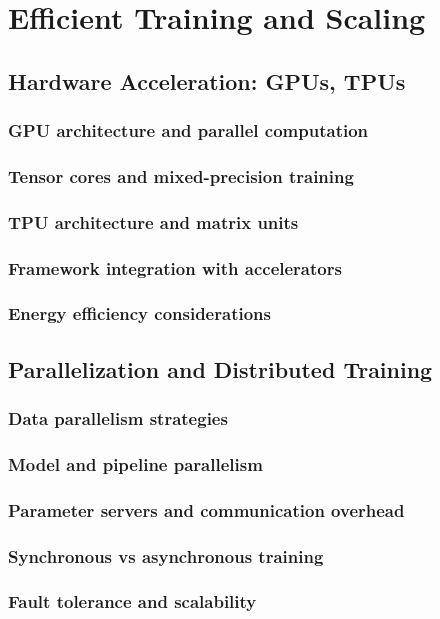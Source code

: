 ﻿\chapter{Efficient Training and Scaling}
\section{Hardware Acceleration: GPUs, TPUs}
\subsection{GPU architecture and parallel computation}
\subsection{Tensor cores and mixed-precision training}
\subsection{TPU architecture and matrix units}
\subsection{Framework integration with accelerators}
\subsection{Energy efficiency considerations}

\section{Parallelization and Distributed Training}
\subsection{Data parallelism strategies}
\subsection{Model and pipeline parallelism}
\subsection{Parameter servers and communication overhead}
\subsection{Synchronous vs asynchronous training}
\subsection{Fault tolerance and scalability}

